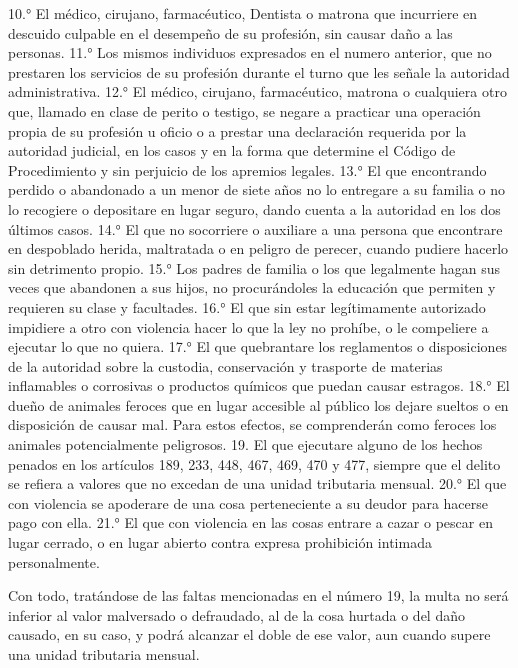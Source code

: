     10.° El médico, cirujano, farmacéutico, Dentista o matrona que incurriere en descuido culpable en el desempeño de su profesión, sin causar daño a las personas.
    11.° Los mismos individuos expresados en el numero anterior, que no prestaren los servicios de su profesión durante el turno que les señale la autoridad administrativa.
    12.° El médico, cirujano, farmacéutico, matrona o cualquiera otro que, llamado en clase de perito o testigo, se negare a practicar una operación propia de su profesión u oficio o a prestar una declaración requerida por la autoridad judicial, en los casos y en la forma que determine el Código de Procedimiento y sin perjuicio de los apremios legales.
    13.° El que encontrando perdido o abandonado a un menor de siete años no lo entregare a su familia o no lo recogiere o depositare en lugar seguro, dando cuenta a la autoridad en los dos últimos casos.
    14.° El que no socorriere o auxiliare a una persona que encontrare en despoblado herida, maltratada o en peligro de perecer, cuando pudiere hacerlo sin detrimento propio.
    15.° Los padres de familia o los que legalmente hagan sus veces que abandonen a sus hijos, no procurándoles la educación que permiten y requieren su clase y facultades.
    16.° El que sin estar legítimamente autorizado impidiere a otro con violencia hacer lo que la ley no prohíbe, o le compeliere a ejecutar lo que no quiera.
    17.° El que quebrantare los reglamentos o disposiciones de la autoridad sobre la custodia, conservación y trasporte de materias inflamables o corrosivas o productos químicos que puedan causar estragos.
    18.° El dueño de animales feroces que en lugar accesible al público los dejare sueltos o en disposición de causar mal.
    Para estos efectos, se comprenderán como feroces los animales potencialmente peligrosos.
    19.  El que ejecutare alguno de los hechos penados en los artículos 189, 233, 448, 467, 469, 470 y 477, siempre que el delito se refiera a valores que no excedan de una  unidad tributaria mensual.
    20.° El que con violencia se apoderare de una cosa perteneciente a su deudor para hacerse pago con ella.
    21.° El que con violencia en las cosas entrare a cazar o pescar en lugar cerrado, o en lugar abierto contra expresa prohibición intimada personalmente.

    Con todo, tratándose de las faltas mencionadas en el número 19, la multa no será inferior al valor malversado o defraudado, al de la cosa hurtada o del daño causado, en su caso, y podrá alcanzar el doble de ese valor, aun cuando supere una unidad tributaria mensual.







